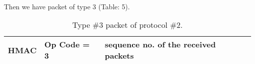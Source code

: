 \documentclass[main.tex]{subfiles}
\begin{document}
\paragraph{}
Then we have packet of type $3$ (Table: 5).\\
\begin{table*}[h!]
\begin{center}
\begin{tabu} to 0.9\textwidth { | X[c]  | X[c]  | X[c]  | }
 \hline
 HMAC &Op Code = 3 & sequence no. of the received packets \\
\hline
\end{tabu}
\caption{Type \#$3$ packet of protocol \#$2$.}
    \label{tab:table$5$}
\end{center}
\end{table*}
\end{document}
